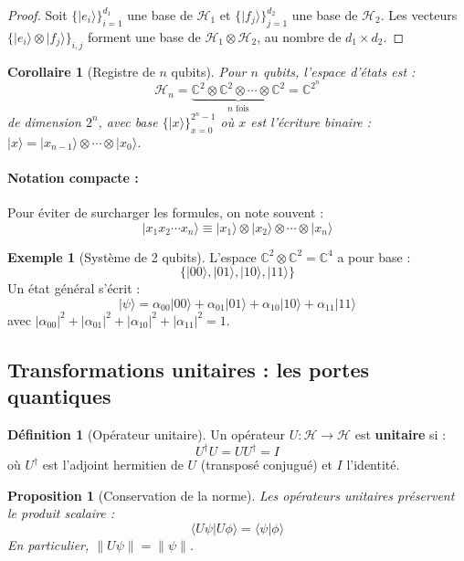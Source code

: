 \documentclass[12pt,a4paper]{article}
\newtheorem{proposition}[theorem]{Proposition}
\newtheorem{corollary}[theorem]{Corollaire}
\theoremstyle{definition}
\newtheorem{definition}[theorem]{Définition}
\newtheorem{example}[theorem]{Exemple}
\theoremstyle{remark}
\begin{document}
\begin{proof}
Soit $\{|e_i\rangle\}_{i=1}^{d_1}$ une base de $\mathcal{H}_1$ et $\{|f_j\rangle\}_{j=1}^{d_2}$ une base de $\mathcal{H}_2$. Les vecteurs $\{|e_i\rangle \otimes |f_j\rangle\}_{i,j}$ forment une base de $\mathcal{H}_1 \otimes \mathcal{H}_2$, au nombre de $d_1 \times d_2$.
\end{proof}

\begin{corollary}[Registre de $n$ qubits]
Pour $n$ qubits, l'espace d'états est :
\[
\mathcal{H}_n = \underbrace{\mathbb{C}^2 \otimes \mathbb{C}^2 \otimes \cdots \otimes \mathbb{C}^2}_{n \text{ fois}} = \mathbb{C}^{2^n}
\]
de dimension $2^n$, avec base $\{|x\rangle\}_{x=0}^{2^n-1}$ où $x$ est l'écriture binaire : $|x\rangle = |x_{n-1}\rangle \otimes \cdots \otimes |x_0\rangle$.
\end{corollary}

\paragraph{Notation compacte :}
Pour éviter de surcharger les formules, on note souvent :
\[
|x_1 x_2 \cdots x_n\rangle \equiv |x_1\rangle \otimes |x_2\rangle \otimes \cdots \otimes |x_n\rangle
\]

\begin{example}[Système de 2 qubits]
L'espace $\mathbb{C}^2 \otimes \mathbb{C}^2 = \mathbb{C}^4$ a pour base :
\[
\{|00\rangle, |01\rangle, |10\rangle, |11\rangle\}
\]
Un état général s'écrit :
\[
|\psi\rangle = \alpha_{00}|00\rangle + \alpha_{01}|01\rangle + \alpha_{10}|10\rangle + \alpha_{11}|11\rangle
\]
avec $|\alpha_{00}|^2 + |\alpha_{01}|^2 + |\alpha_{10}|^2 + |\alpha_{11}|^2 = 1$.
\end{example}

\subsection{Transformations unitaires : les portes quantiques}

\begin{definition}[Opérateur unitaire]
Un opérateur $U : \mathcal{H} \to \mathcal{H}$ est \textbf{unitaire} si :
\[
U^\dagger U = U U^\dagger = I
\]
où $U^\dagger$ est l'adjoint hermitien de $U$ (transposé conjugué) et $I$ l'identité.
\end{definition}

\begin{proposition}[Conservation de la norme]
Les opérateurs unitaires préservent le produit scalaire :
\[
\langle U\psi | U\phi \rangle = \langle \psi | \phi \rangle
\]
En particulier, $\|U\psi\| = \|\psi\|$.
\end{proposition}
\end{document}
